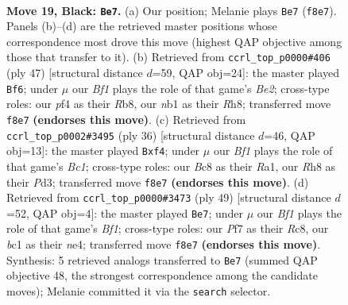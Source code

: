 \documentclass[11pt]{article}
\begin{document}
\clearpage

\begin{figure}[p]\centering
\begin{subfigure}{0.46\textwidth}\centering
\resizebox{\linewidth}{!}{%
\newchessgame
\chessboard[
  setfen={1rb1kb1r/p1p2p1p/2p3p1/2P5/PP3P1P/8/4R3/RNB1K3 b Q - 2 19},
  showmover=false,
  pgfstyle=straightmove, color=movearrow, markmove={f8-e7}
]}
\caption{}
\end{subfigure}\hfill
\begin{subfigure}{0.46\textwidth}\centering
\resizebox{\linewidth}{!}{%
\newchessgame
\chessboard[
  setfen={1r2k2r/4bpp1/p7/2pPpb1p/2N5/1BP2PP1/3K3P/4R2R b k - 2 24},
  showmover=false,
  pgfstyle=straightmove, color=movearrow, markmove={e7-f6}
]}
\caption{}
\end{subfigure}
\\[4pt]
\begin{subfigure}{0.46\textwidth}\centering
\resizebox{\linewidth}{!}{%
\newchessgame
\chessboard[
  setfen={1r2k2r/1Pp1b1p1/5p2/1p5p/5p2/P2P4/1P3P1P/R1B1R1K1 w k - 0 19},
  showmover=false,
  pgfstyle=straightmove, color=movearrow, markmove={c1-f4}
]}
\caption{}
\end{subfigure}\hfill
\begin{subfigure}{0.46\textwidth}\centering
\resizebox{\linewidth}{!}{%
\newchessgame
\chessboard[
  setfen={2r2b1r/1p1k2p1/p3pp2/7p/P2PN3/4P1PP/1P4K1/R1R5 b - - 1 25},
  showmover=false,
  pgfstyle=straightmove, color=movearrow, markmove={f8-e7}
]}
\caption{}
\end{subfigure}
\caption{\textbf{Move 19, Black: \texttt{Be7}.} (a) Our position; Melanie plays \texttt{Be7} (\texttt{f8e7}). Panels (b)--(d) are the retrieved master positions whose correspondence most drove this move (highest QAP objective among those that transfer to it). (b) Retrieved from \texttt{ccrl\_top\_p0000\#406} (ply 47) [structural distance $d$=59, QAP obj=24]: the master played \texttt{Bf6}; under $\mu$ our \emph{Bf1} plays the role of that game's \emph{Be2}; cross-type roles: our \emph{p}f4 as their \emph{R}b8, our \emph{n}b1 as their \emph{R}h8; transferred move \texttt{f8e7} \textbf{(endorses this move)}. (c) Retrieved from \texttt{ccrl\_top\_p0002\#3495} (ply 36) [structural distance $d$=46, QAP obj=13]: the master played \texttt{Bxf4}; under $\mu$ our \emph{Bf1} plays the role of that game's \emph{Bc1}; cross-type roles: our \emph{B}c8 as their \emph{R}a1, our \emph{R}h8 as their \emph{P}d3; transferred move \texttt{f8e7} \textbf{(endorses this move)}. (d) Retrieved from \texttt{ccrl\_top\_p0000\#3473} (ply 49) [structural distance $d$=52, QAP obj=4]: the master played \texttt{Be7}; under $\mu$ our \emph{Bf1} plays the role of that game's \emph{Bf1}; cross-type roles: our \emph{P}f7 as their \emph{R}c8, our \emph{b}c1 as their \emph{n}e4; transferred move \texttt{f8e7} \textbf{(endorses this move)}. Synthesis: 5 retrieved analogs transferred to \texttt{Be7} (summed QAP objective 48, the strongest correspondence among the candidate moves); Melanie committed it via the \texttt{search} selector.}
\label{fig:thought-m37}
\end{figure}
\end{document}
